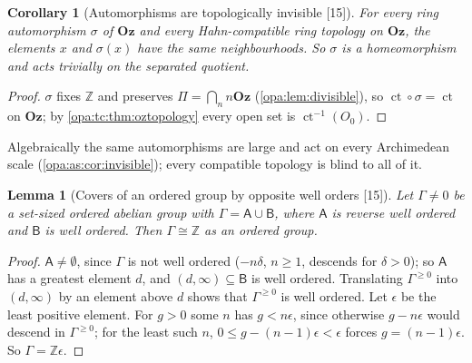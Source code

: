 \documentclass[11pt,oneside]{article}
\numberwithin{equation}{section}
\newtheorem{lemma}[lemma]{Lemma}
\newtheorem{corollary}[corollary]{Corollary}
\theoremstyle{definition}
\theoremstyle{remark}
\newcommand{\Oz}{\mathbf{Oz}}
\newcommand{\Z}{\mathbb Z}
\newcommand{\ct}{\operatorname{ct}}
\newcommand{\src}[1]{\textup{\textsf{\small[#1]}}}
\begin{document}
\begin{corollary}[Automorphisms are topologically invisible \src{15}]\label{opa:tc:cor:topinvisible}
For every ring automorphism $\sigma$ of $\Oz$ and every Hahn-compatible ring topology on $\Oz$, the
elements $x$ and $\sigma(x)$ have the same neighbourhoods. So $\sigma$ is a homeomorphism and acts
trivially on the separated quotient.
\end{corollary}
\begin{proof}
$\sigma$ fixes $\Z$ and preserves $\Pi=\bigcap_nn\Oz$ (\cref{opa:lem:divisible}), so $\ct\circ\sigma=\ct$ on
$\Oz$; by \cref{opa:tc:thm:oztopology} every open set is $\ct^{-1}(O_0)$.
\end{proof}

Algebraically the same automorphisms are large and act on every Archimedean scale
(\cref{opa:as:cor:invisible}); every compatible topology is blind to all of it.

\begin{lemma}[Covers of an ordered group by opposite well orders \src{15}]\label{opa:tc:lem:cycliccover}
Let $\Gamma\ne0$ be a set-sized ordered abelian group with $\Gamma=\mathsf A\cup\mathsf B$, where
$\mathsf A$ is reverse well ordered and $\mathsf B$ is well ordered. Then $\Gamma\cong\Z$ as an ordered
group.
\end{lemma}
\begin{proof}
$\mathsf A\ne\emptyset$, since $\Gamma$ is not well ordered ($-n\delta$, $n\ge1$, descends for $\delta>0$); so
$\mathsf A$ has a greatest element $d$, and $(d,\infty)\subseteq\mathsf B$ is well ordered. Translating
$\Gamma^{\ge0}$ into $(d,\infty)$ by an element above $d$ shows that $\Gamma^{\ge0}$ is well ordered. Let
$\epsilon$ be the least positive element. For $g>0$ some $n$ has $g<n\epsilon$, since otherwise
$g-n\epsilon$ would descend in $\Gamma^{\ge0}$; for the least such $n$,
$0\le g-(n-1)\epsilon<\epsilon$ forces $g=(n-1)\epsilon$. So $\Gamma=\Z\epsilon$.
\end{proof}
\end{document}
